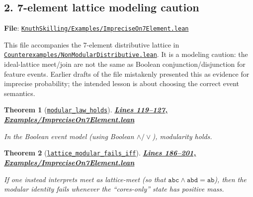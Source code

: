 \documentclass[11pt]{article}
\newtheorem{theorem}{Theorem}[section]
\theoremstyle{definition}
\theoremstyle{remark}
\begin{document}


\subsection*{2. 7-element lattice modeling caution}

\textbf{File}: \href{https://github.com/zariuq/ks-foundations-of-inference/blob/main/KnuthSkilling/Examples/ImpreciseOn7Element.lean}{\texttt{KnuthSkilling/Examples/ImpreciseOn7Element.lean}}

This file accompanies the 7-element distributive lattice in
\href{https://github.com/zariuq/ks-foundations-of-inference/blob/main/KnuthSkilling/Counterexamples/NonModularDistributive.lean}{\texttt{Counterexamples/NonModularDistributive.lean}}.  It is a modeling caution: the ideal-lattice
meet/join are not the same as Boolean conjunction/disjunction for feature events.  Earlier drafts of
the file mistakenly presented this as evidence for imprecise probability; the intended lesson is
about choosing the correct event semantics.

\begin{theorem}[\href{https://github.com/zariuq/ks-foundations-of-inference/blob/main/KnuthSkilling/Examples/ImpreciseOn7Element.lean}{\texttt{modular\_law\_holds}}]
\textbf{\href{https://github.com/zariuq/ks-foundations-of-inference/blob/main/KnuthSkilling/Examples/ImpreciseOn7Element.lean}{Lines 119--127, Examples/ImpreciseOn7Element.lean}}

In the Boolean event model (using Boolean $\wedge/\vee$), modularity holds.
\end{theorem}

\begin{theorem}[\href{https://github.com/zariuq/ks-foundations-of-inference/blob/main/KnuthSkilling/Examples/ImpreciseOn7Element.lean}{\texttt{lattice\_modular\_fails\_iff}}]
\textbf{\href{https://github.com/zariuq/ks-foundations-of-inference/blob/main/KnuthSkilling/Examples/ImpreciseOn7Element.lean}{Lines 186--201, Examples/ImpreciseOn7Element.lean}}

If one instead interprets meet as lattice-meet (so that $\texttt{abc} \wedge \texttt{abd} = \texttt{ab}$),
then the modular identity fails whenever the ``cores-only'' state has positive mass.
\end{theorem}
\end{document}
